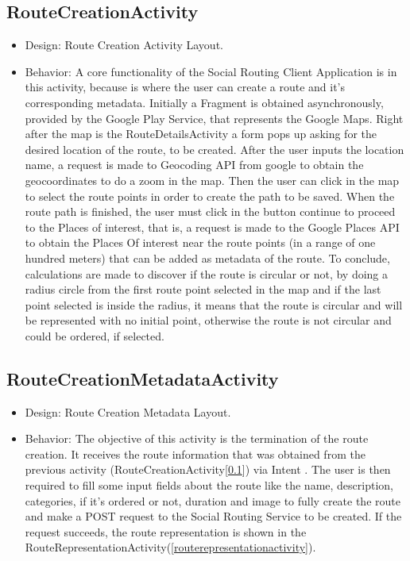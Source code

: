 \subsection{RouteCreationActivity} \label{routecreationactivity}
\begin{itemize}
        \item Design: Route Creation Activity Layout.\cite{routecreationactivitylayout}
        \item Behavior: A core functionality of the Social Routing Client Application is in this activity, because is where the user can create a route and it's corresponding metadata.
        Initially a Fragment is obtained asynchronously, provided by the Google Play Service\cite{googleplayservices}, that represents the Google Maps\cite{googlemaps}. Right after the map is the RouteDetailsActivity
        a form pops up asking for the desired location of the route, to be created. After the user inputs the location name, a request is made to Geocoding API\cite{geocodingapi} from google to obtain 
        the geocoordinates to do a zoom in the map. Then the user can click in the map to select the route points in order to create the path to be saved. When the route path is 
        finished, the user must click in the button continue to proceed to the Places of interest, that is, a request is made to the Google Places API\cite{googleplacesapi} to obtain the Places Of interest
        near the route points (in a range of one hundred meters) that can be added as metadata of the route. To conclude, calculations are made to discover if the route is circular or not, by doing a radius circle from
        the first route point selected in the map and if the last point selected is inside the radius, it means that the route is circular and will be represented with no initial point, otherwise 
        the route is not circular and could be ordered, if selected. 
\end{itemize}
\newpage
\subsection{RouteCreationMetadataActivity} \label{routecreationmetadataactivity}
\begin{itemize}
        \item Design: Route Creation Metadata Layout.\cite{routecreationametadatactivitylayout}
        \item Behavior: The objective of this activity is the termination of the route creation. It receives the route information that was obtained from the previous activity (RouteCreationActivity[\ref{routecreationactivity}])
        via Intent \cite{intent}. The user is then required to fill some input fields about the route like the name, description, categories, if it's ordered or not, duration and image to fully create the route and make a POST 
        request to the Social Routing Service to be created. If the request succeeds, the route representation is shown in the RouteRepresentationActivity(\ref{routerepresentationactivity}).
\end{itemize}

